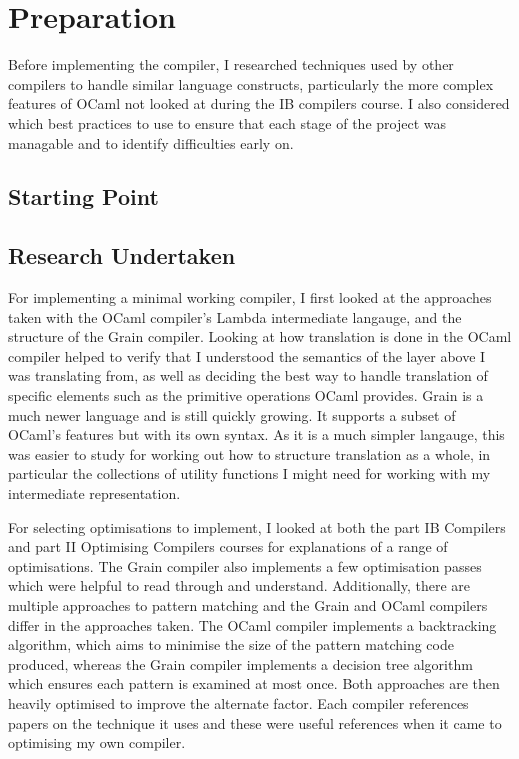 \chapter{Preparation} %
Before implementing the compiler, I researched techniques used by other compilers to handle similar language constructs, particularly the more complex features of OCaml not looked at during the IB compilers course. I also considered which best practices to use to ensure that each stage of the project was managable and to identify difficulties early on.

\section{Starting Point}



\section{Research Undertaken}
For implementing a minimal working compiler, I first looked at the approaches taken with the OCaml compiler's Lambda intermediate langauge, and the structure of the Grain compiler. Looking at how translation is done in the OCaml compiler helped to verify that I understood the semantics of the layer above I was translating from, as well as deciding the best way to handle translation of specific elements such as the primitive operations OCaml provides. Grain is a much newer language and is still quickly growing. It supports a subset of OCaml's features but with its own syntax. As it is a much simpler langauge, this was easier to study for working out how to structure translation as a whole, in particular the collections of utility functions I might need for working with my intermediate representation. 

For selecting optimisations to implement, I looked at both the part IB Compilers and part II Optimising Compilers courses for explanations of a range of optimisations. The Grain compiler also implements a few optimisation passes which were helpful to read through and understand. Additionally, there are multiple approaches to pattern matching and the Grain and OCaml compilers differ in the approaches taken. The OCaml compiler implements a backtracking algorithm, which aims to minimise the size of the pattern matching code produced, whereas the Grain compiler implements a decision tree algorithm which ensures each pattern is examined at most once. Both approaches are then heavily optimised to improve the alternate factor. Each compiler references papers on the technique it uses %
and these were useful references when it came to optimising my own compiler. 

